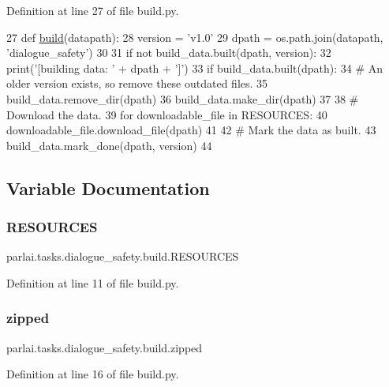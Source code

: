 Definition at line 27 of file build.\+py.


\begin{DoxyCode}
27 \textcolor{keyword}{def }\hyperlink{namespacedialog__babi__feedback_1_1build_a7a9d289f7493a5ded13c4b7f071b6184}{build}(datapath):
28     version = \textcolor{stringliteral}{'v1.0'}
29     dpath = os.path.join(datapath, \textcolor{stringliteral}{'dialogue\_safety'})
30 
31     \textcolor{keywordflow}{if} \textcolor{keywordflow}{not} build\_data.built(dpath, version):
32         print(\textcolor{stringliteral}{'[building data: '} + dpath + \textcolor{stringliteral}{']'})
33         \textcolor{keywordflow}{if} build\_data.built(dpath):
34             \textcolor{comment}{# An older version exists, so remove these outdated files.}
35             build\_data.remove\_dir(dpath)
36         build\_data.make\_dir(dpath)
37 
38         \textcolor{comment}{# Download the data.}
39         \textcolor{keywordflow}{for} downloadable\_file \textcolor{keywordflow}{in} RESOURCES:
40             downloadable\_file.download\_file(dpath)
41 
42         \textcolor{comment}{# Mark the data as built.}
43         build\_data.mark\_done(dpath, version)
44 \end{DoxyCode}


\subsection{Variable Documentation}
\mbox{\label{namespaceparlai_1_1tasks_1_1dialogue__safety_1_1build_aad22d072dd08c53383284b9a7270fed5}} 
\subsubsection{\texorpdfstring{R\+E\+S\+O\+U\+R\+C\+ES}{RESOURCES}}
{\footnotesize\ttfamily parlai.\+tasks.\+dialogue\+\_\+safety.\+build.\+R\+E\+S\+O\+U\+R\+C\+ES}



Definition at line 11 of file build.\+py.

\mbox{\label{namespaceparlai_1_1tasks_1_1dialogue__safety_1_1build_a64add3ae57430e2e21bb466a9b732820}} 
\subsubsection{\texorpdfstring{zipped}{zipped}}
{\footnotesize\ttfamily parlai.\+tasks.\+dialogue\+\_\+safety.\+build.\+zipped}



Definition at line 16 of file build.\+py.

